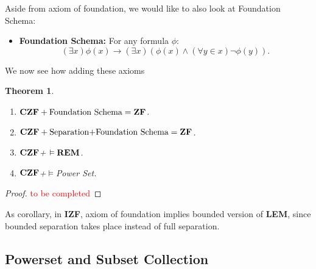 \documentclass[12pt, a4paper]{article}
\theoremstyle{definition}
\theoremstyle{plain}
\newtheorem{theorem}{Theorem}
\begin{document}
Aside from axiom of foundation, we would like to also look at Foundation Schema:
\begin{itemize}
\item {\bf Foundation Schema:} For any formula $\phi$: $$(\exists x)\phi(x) \rightarrow (\exists x)(\phi(x) \wedge (\forall y \in x)\neg \phi(y)).$$
\end{itemize}

We now see how adding these axioms 

\begin{theorem}
\begin{enumerate}
\item[(i)] ${\bf CZF}+\text{Foundation Schema}={\bf ZF}$.
\item[(ii)] ${\bf CZF}+\text{Separation+Foundation Schema}={\bf ZF}$.
\item[(iii)] ${\bf CZF}$+ $\vDash {\bf REM}$.
\item[(iv)] ${\bf CZF}$+$\vDash$Power Set.
\end{enumerate}
\end{theorem}
\begin{proof}
\textcolor{red}{to be completed}
\end{proof}

As corollary, in {\bf IZF}, axiom of foundation implies bounded version of {\bf LEM}, since bounded separation takes place instead of full separation.

\subsection{Powerset and Subset Collection}
\end{document}
